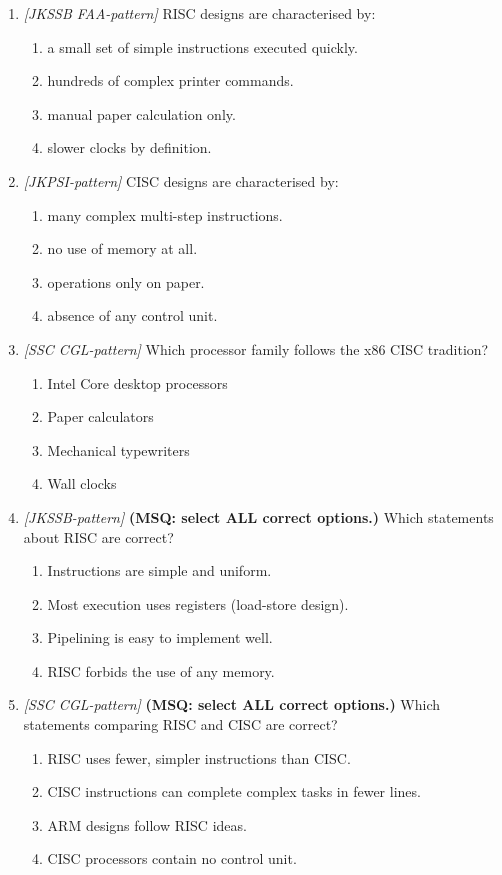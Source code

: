 \documentclass[11pt]{article}
\begin{document}
\begin{enumerate}[label=\textbf{Q\arabic*.}, leftmargin=*]
\item \textit{[JKSSB FAA-pattern]} RISC designs are characterised by:
  \begin{enumerate}[label=\Alph*.]
    \item a small set of simple instructions executed quickly.
    \item hundreds of complex printer commands.
    \item manual paper calculation only.
    \item slower clocks by definition.
  \end{enumerate}
\item \textit{[JKPSI-pattern]} CISC designs are characterised by:
  \begin{enumerate}[label=\Alph*.]
    \item many complex multi-step instructions.
    \item no use of memory at all.
    \item operations only on paper.
    \item absence of any control unit.
  \end{enumerate}
\item \textit{[SSC CGL-pattern]} Which processor family follows the x86 CISC tradition?
  \begin{enumerate}[label=\Alph*.]
    \item Intel Core desktop processors
    \item Paper calculators
    \item Mechanical typewriters
    \item Wall clocks
  \end{enumerate}
\item \textit{[JKSSB-pattern]} \textbf{(MSQ: select ALL correct options.)} Which statements about RISC are correct?
  \begin{enumerate}[label=\Alph*.]
    \item Instructions are simple and uniform.
    \item Most execution uses registers (load-store design).
    \item Pipelining is easy to implement well.
    \item RISC forbids the use of any memory.
  \end{enumerate}
\item \textit{[SSC CGL-pattern]} \textbf{(MSQ: select ALL correct options.)} Which statements comparing RISC and CISC are correct?
  \begin{enumerate}[label=\Alph*.]
    \item RISC uses fewer, simpler instructions than CISC.
    \item CISC instructions can complete complex tasks in fewer lines.
    \item ARM designs follow RISC ideas.
    \item CISC processors contain no control unit.
  \end{enumerate}
\end{enumerate}
\def\JKSSBLessonID{59}\def\JKSSBAnswers{0}
\end{document}

